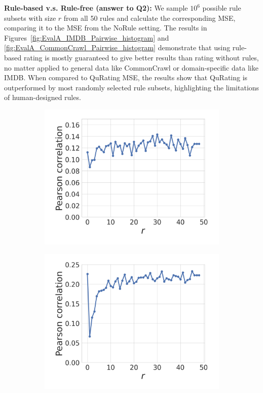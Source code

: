 \documentclass{article}
\begin{document}
\textbf{Rule-based v.s. Rule-free (answer to \textbf{Q2}):} We sample $10^6$ possible rule subsets with size $r$ from all 50 rules and calculate the corresponding MSE, comparing it to the MSE from the NoRule setting. The results in Figures~\ref{fig:EvalA_IMDB_Pairwise_histogram} and \ref{fig:EvalA_CommonCrawl_Pairwise_histogram}
demonstrate that using rule-based rating is mostly guaranteed to give better results than rating without rules, no matter applied to general data like CommonCrawl or domain-specific data like IMDB. When compared to QuRating MSE, the results show that QuRating is outperformed by most randomly selected rule subsets, highlighting the limitations of human-designed rules.
\begin{figure}[h]
\centering
\begin{subfigure}[b]{0.23\linewidth} 
    \centering
    \includegraphics[width=\linewidth]{figures/EvalA_IMDB_Pairwise_pearson.pdf}
    \caption{}
    \label{fig:EvalA_IMDB_Pairwise_pearson}
\end{subfigure}
\begin{subfigure}[b]{0.23\linewidth} 
    \centering
    \includegraphics[width=\linewidth]{figures/EvalA_CommonCrawl_Pairwise_pearson.pdf}

\end{subfigure}
\end{figure}
\end{document}

